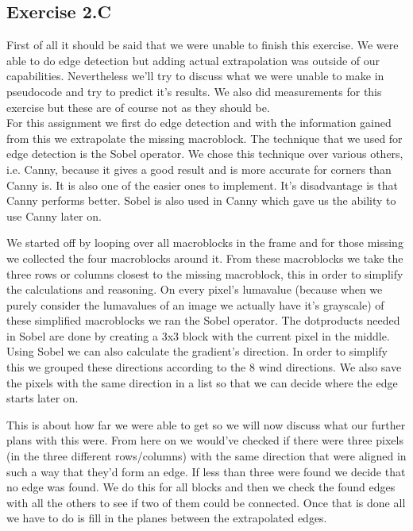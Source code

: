 \documentclass[a4paper,11pt,oneside]{article}
\begin{document}
\subsection*{Exercise 2.C}
First of all it should be said that we were unable to finish this exercise. We were able to do edge detection but adding actual extrapolation was outside of our capabilities. Nevertheless we'll try to discuss what we were unable to make in pseudocode and try to predict it's results. We also did measurements for this exercise but these are of course not as they should be.\\
For this assignment we first do edge detection and with the information gained from this we extrapolate the missing macroblock. The technique that we used for edge detection is the Sobel operator. We chose this technique over various others, i.e. Canny, because it gives a good result and is more accurate for corners than Canny is. It is  also one of the easier ones to implement. It's disadvantage is that Canny performs better. Sobel is also used in Canny which gave us the ability to use Canny later on.\par
We started off by looping over all macroblocks in the frame and for those missing we collected the four macroblocks around it. From these macroblocks we take the three rows or columns closest to the missing macroblock, this in order to simplify the calculations and reasoning. On every pixel's lumavalue (because when we purely consider the lumavalues of an image we actually have it's grayscale)   of these  simplified macroblocks we ran the Sobel operator. The dotproducts needed in Sobel are done by creating a 3x3 block with the current pixel in the middle. Using Sobel we can also calculate the gradient's direction. In order to simplify this we grouped these directions according to the 8 wind directions. We also save the pixels with the same direction in a list so that we can decide where the edge starts later on.\par
This is about how far we were able to get so we will now discuss what our further plans with this were. From here on we would've checked if there were three pixels (in the three different rows/columns) with the same direction that were aligned in such a way that they'd form an edge. If less than three were found we decide that no edge was found. We do this for all blocks and then we check the found edges with all the others to see if two of them could be connected. Once that is done all we have to do is fill in the planes between the extrapolated edges.\\
\end{document}
